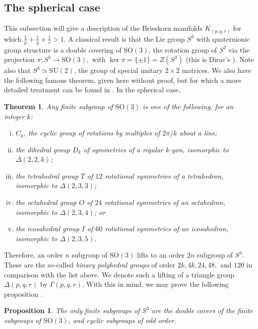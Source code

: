 \documentclass{article}
\newtheorem{theorem}{Theorem}[section]
\newtheorem{proposition}{Proposition}[section]
\begin{document}
\subsection{The spherical case}

This subsection will give a description of the Brieskorn manifolds $K_{(p,q,r)}$ for which $\frac{1}{p} + \frac{1}{q} + \frac{1}{r} > 1$. A classical result is that the Lie group $S^3$ with quaternionic group structure is a double covering of $\mathrm{SO(3)}$, the rotation group of $S^2$ via the projection $\pi: S^3 \to \mathrm{SO}(3),$ with $\ker \pi = \{\pm 1\} = Z(S^3)$ (this is Dirac's ). Note also that $S^3 \simeq \mathrm{SU}(2)$, the group of special unitary $2\times 2$ matrices. We also have the following famous theorem, given here without proof, but for which a more detailed treatment can be found in \cite{artin_2011}. In the spherical case,
\begin{theorem}
\label{4.2}
Any finite subgroup of $\mathrm{SO}(3)$ is one of the following, for an integer $k$:
\begin{enumerate}[(i)]
    \item $C_k$, the cyclic group of rotations by multiples of $2 \pi/k$ about a line;
    \item the dihedral group $D_k$ of symmetries of a regular $k$-gon, isomorphic to $\Delta(2,2,k)$;
    \item the tetrahedral group $T$ of $12$ rotational symmetries of a tetrahedron, isomorphic to $\Delta(2,3,3)$;
    \item the octahedral group $O$ of $24$ rotational symmetries of an octahedron, isomorphic to $\Delta(2,3,4)$; or
    \item the icosahedral group $I$ of $60$ rotational symmetries of an icosahedron, isomorphic to $\Delta(2,3,5).$
\end{enumerate}
\end{theorem}
Therefore, an order $n$ subgroup of $\mathrm{SO}(3)$ lifts to an order $2n$ subgroup of $S^3$. These are the so-called \textit{binary polyhedral groups} of order $2k, 4k, 24, 48,$ and $120$ in comparison with the list above. We denote such a lifting of a triangle group $\Delta(p,q,r)$ by $\Gamma(p,q,r)$. With this in mind, we may prove the following proposition \cite{seade_2006}.
\begin{proposition}
The only finite subgroups of $S^3$ are the double covers of the finite subgroups of $\mathrm{SO}(3)$, and cyclic subgroups of odd order.
\end{proposition}
\end{document}
